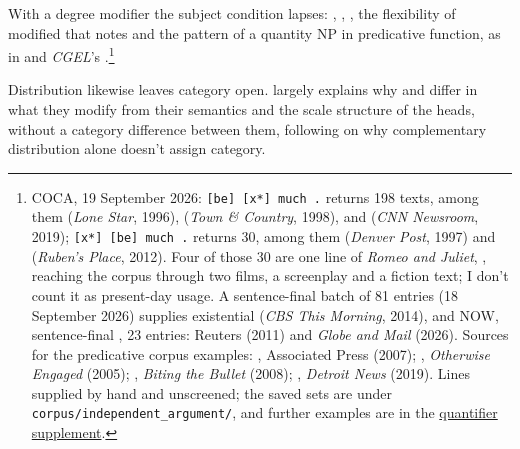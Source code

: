 \documentclass[12pt]{article}
\begin{document}
With a degree modifier the subject condition lapses: , , , the flexibility of modified  that \textcite{reynolds2024why} notes and the pattern of a quantity NP in predicative function, as in  and \textit{CGEL}'s  \citep[395]{huddleston2002}.\footnote{COCA, 19 September 2026: \texttt{[be] [x*] much .} returns 198 texts, among them  (\textit{Lone Star}, 1996),  (\textit{Town \& Country}, 1998), and  (\textit{CNN Newsroom}, 2019); \texttt{[x*] [be] much .} returns 30, among them  (\textit{Denver Post}, 1997) and  (\textit{Ruben's Place}, 2012). Four of those 30 are one line of \textit{Romeo and Juliet}, , reaching the corpus through two films, a screenplay and a fiction text; I don't count it as present-day usage. A sentence-final  batch of 81 entries (18 September 2026) supplies existential  (\textit{CBS This Morning}, 2014), and NOW, sentence-final , 23 entries: Reuters (2011) and \textit{Globe and Mail} (2026). Sources for the predicative corpus examples: , Associated Press (2007); , \textit{Otherwise Engaged} (2005); , \textit{Biting the Bullet} (2008); , \textit{Detroit News} (2019). Lines supplied by hand and unscreened; the saved sets are under \texttt{corpus/independent\_argument/}, and further examples are in the \href{run:quantifier-controls.pdf}{quantifier supplement}.}

Distribution likewise leaves category open. \textcite{reynolds2024why} largely explains why  and  differ in what they modify from their semantics and the scale structure of the heads, without a category difference between them, following \textcite[61]{payne2010} on why complementary distribution alone doesn't assign category.
\end{document}
